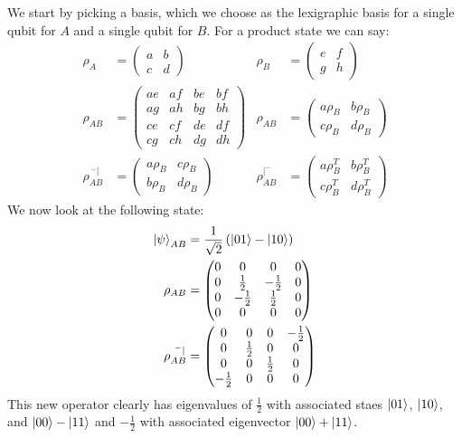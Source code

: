We start by picking a basis, which we choose as the lexigraphic basis for a single qubit for $A$ and a single qubit for $B$. For a product state we can say:
\begin{align*}
	\rho_A &= \begin{pmatrix}
		a & b \\
		c & d
	\end{pmatrix} &
	\rho_B &= \begin{pmatrix}
		e & f \\
		g & h
		  \end{pmatrix} \\
	\rho_{AB} &= \begin{pmatrix}
		ae & af & be & bf \\
		ag & ah & bg & bh \\
		ce & cf & de & df \\
		cg & ch & dg & dh
	\end{pmatrix} &
	\rho_{AB} &= \begin{pmatrix}
		a\rho_B & b\rho_B \\
		c\rho_B & d\rho_B
		     \end{pmatrix} \\
	\rho_{AB}^{\ ^-|} &= \begin{pmatrix}
		a\rho_B & c\rho_B \\
		b\rho_B & d\rho_B
	\end{pmatrix} &
	\rho_{AB}^{|^-} &= \begin{pmatrix}
		a\rho_B^T & b\rho_B^T \\
		c\rho_B^T & d\rho_B^T
			   \end{pmatrix}
\end{align*}
We now look at the following state:
\begin{align*}
	\ket{\psi}_{AB} &= \frac{1}{\sqrt{2}}\left(\ket{01} - \ket{10}\right) \\
	\rho_{AB} &= \begin{pmatrix}
		0 & 0 & 0 & 0 \\
		0 & \frac{1}{2} & -\frac{1}{2} & 0 \\
		0 & -\frac{1}{2} & \frac{1}{2} & 0 \\
		0 & 0 & 0 & 0
		     \end{pmatrix} \\
	\rho_{AB}^{\ ^-|} &= \begin{pmatrix}
		0 & 0 & 0 & -\frac{1}{2} \\
		0 & \frac{1}{2} & 0 & 0 \\
		0 & 0 & \frac{1}{2} & 0 \\
		-\frac{1}{2} & 0 & 0 & 0
			     \end{pmatrix}
\end{align*}
This new operator clearly has eigenvalues of $\frac{1}{2}$ with associated staes $\ket{01}$, $\ket{10}$, and $\ket{00} - \ket{11}$ and $-\frac{1}{2}$ with associated eigenvector $\ket{00} + \ket{11}$.


